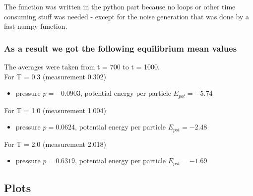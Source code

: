 \documentclass[12pt,a4paper]{scrartcl}
\begin{document}
The function was written in the python part because no loops or other time consuming stuff was needed - except for the noise generation that was done by a fast numpy function.

\subsubsection*{As a result we got the following equilibrium mean values}
The averages were taken from t = 700 to t = 1000.\\
For T = 0.3 (measurement 0.302)
\begin{itemize}
\item pressure $p = -0.0903$, potential energy per particle $E_{pot} = -5.74$
\end{itemize}

For T = 1.0 (measurement 1.004)
\begin{itemize}
\item pressure $p = 0.0624$, potential energy per particle $E_{pot} = -2.48$
\end{itemize}

For T = 2.0 (measurement 2.018)
\begin{itemize}
\item pressure $p = 0.6319$, potential energy per particle $E_{pot} = -1.69$
\end{itemize}

\subsection{Plots}
\end{document}
